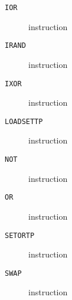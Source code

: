 \begin{description}
\item[\texttt{IOR}] instruction\\

\end{description}
\clearpage
\begin{description}
\item[\texttt{IRAND}] instruction\\

\end{description}
\clearpage
\begin{description}
\item[\texttt{IXOR}] instruction\\

\end{description}
\clearpage
\begin{description}
\item[\texttt{LOADSETTP}] instruction\\

\end{description}
\clearpage
\begin{description}
\item[\texttt{NOT}] instruction\\

\end{description}
\clearpage
\begin{description}
\item[\texttt{OR}] instruction\\

\end{description}
\clearpage
\begin{description}
\item[\texttt{SETORTP}] instruction\\

\end{description}
\clearpage
\begin{description}
\item[\texttt{SWAP}] instruction\\

\end{description}
\clearpage

